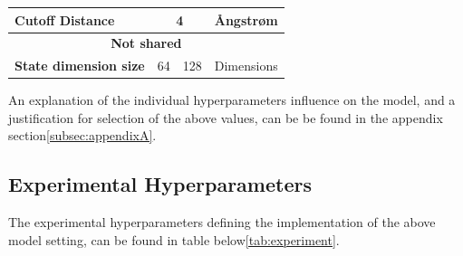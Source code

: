 \begin{table}[H]
\begin{tabular}{|lcll|}
        \multicolumn{1}{|l|}{\textbf{Cutoff Distance}}                       & \multicolumn{2}{c|}{4}                        & Ångstrøm                                                                \\ \hline
        \multicolumn{4}{|c|}{\textbf{Not shared}}                                                                                                                                                      \\ \hline
        \multicolumn{1}{|l|}{\textbf{State dimension size}}                  & \multicolumn{1}{c|}{64}                       & \multicolumn{1}{c|}{128}                       & Dimensions             \\ \hline
    \end{tabular}
\end{table}

An explanation of the individual hyperparameters influence on the model, and a justification for selection of the above values, can be
be found in the appendix section\ref{subsec:appendixA}.

\subsection{Experimental Hyperparameters}\label{subsec:experiement}

The experimental hyperparameters defining the implementation of the above model setting, can be found in
table below\ref{tab:experiment}.

